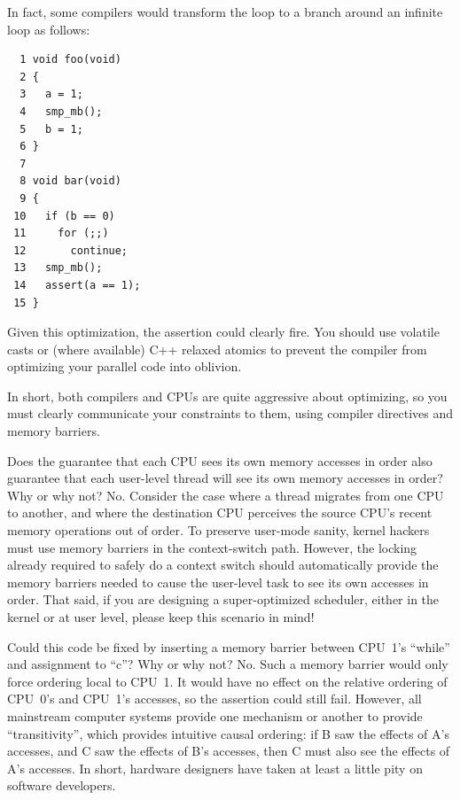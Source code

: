 	In fact, some compilers would transform the loop to a branch
	around an infinite loop as follows:

\vspace{5pt}
\begin{minipage}[t]{\columnwidth}
\small
\begin{verbatim}
  1 void foo(void)
  2 {
  3   a = 1;
  4   smp_mb();
  5   b = 1;
  6 }
  7 
  8 void bar(void)
  9 {
 10   if (b == 0)
 11     for (;;)
 12       continue;
 13   smp_mb();
 14   assert(a == 1);
 15 }
\end{verbatim}
\end{minipage}
\vspace{5pt}

	Given this optimization, the assertion could clearly fire.
	You should use volatile casts or (where available) C++
	relaxed atomics to prevent the compiler from optimizing
	your parallel code into oblivion.

	In short, both compilers and CPUs are quite aggressive about
	optimizing, so you must clearly communicate your constraints
	to them, using compiler directives and memory barriers.


\QuickQ{}
	Does the guarantee that each CPU sees its own memory accesses
	in order also guarantee that each user-level thread will see
	its own memory accesses in order?
	Why or why not?
\QuickA{}
	No.  Consider the case where a thread migrates from one CPU to
	another, and where the destination CPU perceives the source
	CPU's recent memory operations out of order.  To preserve
	user-mode sanity, kernel hackers must use memory barriers in
	the context-switch path.  However, the locking already required
	to safely do a context switch should automatically provide
	the memory barriers needed to cause the user-level task to see
	its own accesses in order.  That said, if you are designing a
	super-optimized scheduler, either in the kernel or at user level,
	please keep this scenario in mind!

\QuickQ{}
	Could this code be fixed by inserting a memory barrier
	between CPU~1's ``while'' and assignment to ``c''?
	Why or why not?
\QuickA{}
	No.  Such a memory barrier would only force ordering local to CPU~1.
	It would have no effect on the relative ordering of CPU~0's and
	CPU~1's accesses, so the assertion could still fail.
	However, all mainstream computer systems provide one mechanism
	or another to provide ``transitivity'', which provides
	intuitive causal ordering: if B saw the effects of A's accesses,
	and C saw the effects of B's accesses, then C must also see
	the effects of A's accesses.
	In short, hardware designers have taken at least a little pity
	on software developers.

